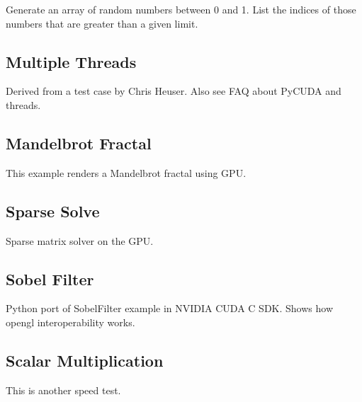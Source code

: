 \documentclass{article}
\begin{document}
Generate an array of random numbers between 0 and 1.
List the indices of those numbers that are greater than a given limit.

\subsection{Multiple Threads}

Derived from a test case by Chris Heuser.
Also see FAQ about PyCUDA and threads.

\subsection{Mandelbrot Fractal}

This example renders a Mandelbrot fractal using GPU.

\subsection{Sparse Solve}

Sparse matrix solver on the GPU.

\subsection{Sobel Filter}

Python port of SobelFilter example in NVIDIA CUDA C SDK. Shows how opengl interoperability works.

\subsection{Scalar Multiplication}

This is another speed test.
\end{document}
